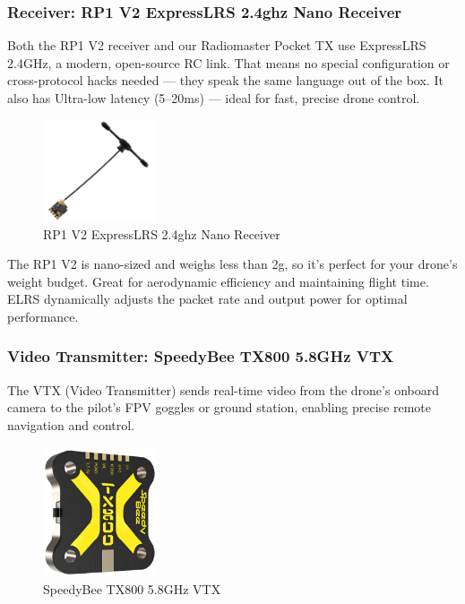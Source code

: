 \documentclass[12pt]{report}
\begin{document}
        \subsubsection{\large Receiver: RP1 V2 ExpressLRS 2.4ghz Nano Receiver}
        Both the RP1 V2 receiver and our Radiomaster Pocket TX use ExpressLRS 2.4GHz, a modern, open-source RC link. That means no special configuration or cross-protocol hacks needed — they speak the same language out of the box. It also has Ultra-low latency (5–20ms) — ideal for fast, precise drone control. \\ 

        
        \begin{figure}[H]
          \centering  
          \includegraphics[width=0.3\textwidth]{receiver.png}
          \caption{RP1 V2 ExpressLRS 2.4ghz Nano Receiver}
          \label{fig:receiver}
        \end{figure}

        The RP1 V2 is nano-sized and weighs less than 2g, so it's perfect for your drone’s weight budget. Great for aerodynamic efficiency and maintaining flight time. ELRS dynamically adjusts the packet rate and output power for optimal performance.

\newpage
        \subsubsection{\large Video Transmitter: SpeedyBee TX800 5.8GHz VTX}
        The VTX (Video Transmitter) sends real-time video from the drone’s onboard camera to the pilot’s FPV goggles or ground station, enabling precise remote navigation and control.
        \begin{figure}[H]
          \centering  
          \includegraphics[width=0.3\textwidth]{vtx.png}
          \caption{SpeedyBee TX800 5.8GHz VTX}
          \label{fig:vtx}
        \end{figure}
\end{document}
